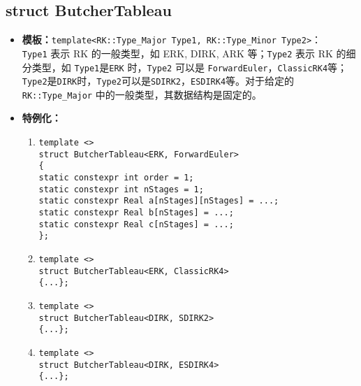 \documentclass[a4paper,twoside]{ctexart}
\begin{document}
\subsection{struct ButcherTableau}
\begin{itemize}
    \item \textbf{模板：}\texttt{template<RK::Type\_Major Type1, RK::Type\_Minor Type2>}：\\\texttt{Type1} 表示 RK 的一般类型，如 ERK, DIRK, ARK 等；\texttt{Type2} 表示 RK 的细分类型，如 \texttt{Type1}是\texttt{ERK} 时，\texttt{Type2} 可以是 \texttt{ForwardEuler}，\texttt{ClassicRK4}等；\texttt{Type2}是\texttt{DIRK}时，\texttt{Type2}可以是\texttt{SDIRK2}，\texttt{ESDIRK4}等。对于给定的 \texttt{RK::Type\_Major} 中的一般类型，其数据结构是固定的。
    \item \textbf{特例化：}
            \begin{enumerate}[(1)]
                \item \texttt{template <>\\
                struct ButcherTableau<ERK, ForwardEuler>\\
                \{\\
                \hspace*{4pt} static constexpr int order = 1;\\
                \hspace*{4pt} static constexpr int nStages = 1;\\
                \hspace*{4pt} static constexpr Real a[nStages][nStages] = ...;\\
                \hspace*{4pt} static constexpr Real b[nStages] = ...;\\
                \hspace*{4pt} static constexpr Real c[nStages] = ...;\\
                \};}
            \item \texttt{template <>\\
                struct ButcherTableau<ERK, ClassicRK4>\\
                \{...\};}
            \item \texttt{template <>\\
                struct ButcherTableau<DIRK, SDIRK2>\\
                \{...\};}
            \item \texttt{template <>\\
                struct ButcherTableau<DIRK, ESDIRK4>\\
                \{...\};}
            \end{enumerate} 
\end{itemize}
\end{document}
